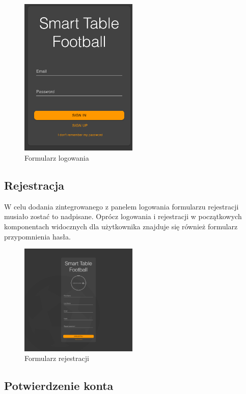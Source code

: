 \begin{figure}[h!]
  \centering
    \includegraphics[width=0.5\textwidth]{images/player/login.png}
  \caption{Formularz logowania}
  \label{fig:mobile}
\end{figure}

\subsection{Rejestracja}

 W celu dodania zintegrowanego z panelem logowania formularzu rejestracji musiało zostać to nadpisane. Oprócz logowania i rejestracji w początkowych komponentach widocznych dla użytkownika znajduje się również formularz przypomnienia hasła.

\begin{figure}[h!]
  \centering
    \includegraphics[width=0.5\textwidth]{images/player/registration.png}
  \caption{Formularz rejestracji}
  \label{fig:mobile}
\end{figure}

\subsection{Potwierdzenie konta}

